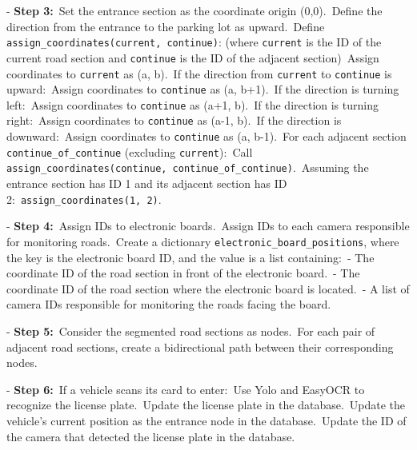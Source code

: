 \documentclass{article}
\newcommand{\tab}{\hspace*{2em}}
\begin{document}
\begin{itemize}[label=-]
\noindent - \textbf{Step 3:}\
Set the entrance section as the coordinate origin (0,0).\
Define the direction from the entrance to the parking lot as upward.\
Define \texttt{assign\_coordinates(current, continue)}: (where \texttt{current} is the ID of the current road section and \texttt{continue} is the ID of the adjacent section)\
\tab Assign coordinates to \texttt{current} as (a, b).\
\tab If the direction from \texttt{current} to \texttt{continue} is upward:\
\tab \tab Assign coordinates to \texttt{continue} as (a, b+1).\
\tab If the direction is turning left:\
\tab \tab Assign coordinates to \texttt{continue} as (a+1, b).\
\tab If the direction is turning right:\
\tab \tab Assign coordinates to \texttt{continue} as (a-1, b).\
\tab If the direction is downward:\
\tab \tab Assign coordinates to \texttt{continue} as (a, b-1).\
\tab For each adjacent section \texttt{continue\_of\_continue} (excluding \texttt{current}):\
\tab \tab Call \texttt{assign\_coordinates(continue, continue\_of\_continue)}.\
Assuming the entrance section has ID 1 and its adjacent section has ID 2:\
\texttt{assign\_coordinates(1, 2)}.\

\noindent - \textbf{Step 4:}\
Assign IDs to electronic boards.\
Assign IDs to each camera responsible for monitoring roads.\
Create a dictionary \texttt{electronic\_board\_positions}, where the key is the electronic board ID, and the value is a list containing:\
- The coordinate ID of the road section in front of the electronic board.\
- The coordinate ID of the road section where the electronic board is located.\
- A list of camera IDs responsible for monitoring the roads facing the board.\

\noindent - \textbf{Step 5:}\
Consider the segmented road sections as nodes.\
For each pair of adjacent road sections, create a bidirectional path between their corresponding nodes.\

\noindent - \textbf{Step 6:}\
If a vehicle scans its card to enter:\
\tab Use Yolo and EasyOCR to recognize the license plate.\
\tab Update the license plate in the database.\
\tab Update the vehicle's current position as the entrance node in the database.\
\tab Update the ID of the camera that detected the license plate in the database.\


\end{itemize}
\end{document}
